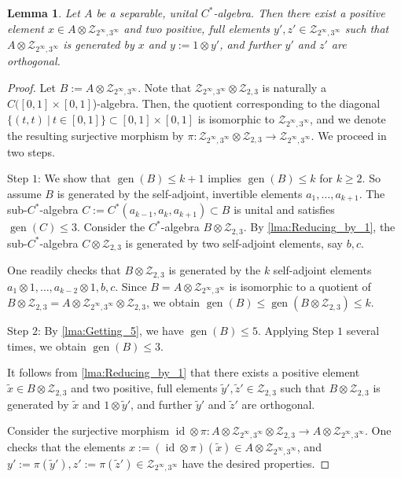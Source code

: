 \documentclass{amsart}
\newtheorem{lma}{Lemma}[section]
\theoremstyle{definition}
\begin{document}
\begin{lma}
\label{lma:Tensor_inf_dd_2}
    Let $A$ be a separable, unital {{$C^*$-al\-ge\-bra}}{}.
    Then there exist a positive element $x\in A\otimes \mathcal{Z}_{2^\infty,3^\infty}$ and two positive, full elements $y',z'\in \mathcal{Z}_{2^\infty,3^\infty}$ such that $A\otimes \mathcal{Z}_{2^\infty,3^\infty}$ is generated by $x$ and $y:=1\otimes y'$, and further $y'$ and $z'$ are orthogonal.
\end{lma}
\begin{proof}
    Let $B:=A\otimes\mathcal{Z}_{2^\infty,3^\infty}$.
    Note that $\mathcal{Z}_{2^\infty,3^\infty}\otimes\mathcal{Z}_{2,3}$ is naturally a $C([0,1]\times[0,1]$)-algebra.
    Then, the quotient corresponding to the diagonal $\{(t,t){\: |\:} t\in[0,1]\}\subset[0,1]\times[0,1]$ is isomorphic to $\mathcal{Z}_{2^\infty,3^\infty}$, and we denote the resulting surjective morphism by $\pi\colon\mathcal{Z}_{2^\infty,3^\infty}\otimes\mathcal{Z}_{2,3}\to\mathcal{Z}_{2^\infty,3^\infty}$.
    We proceed in two steps.

    Step $1$:
    We show that $\operatorname{gen}(B)\leq k+1$ implies $\operatorname{gen}(B)\leq k$ for $k\geq 2$.
    So assume $B$ is generated by the self-adjoint, invertible elements $a_1,\ldots,a_{k+1}$.
    The sub-{{$C^*$-al\-ge\-bra}}{} $C:=C^{*}(a_{k-1},a_k,a_{k+1})\subset B$ is unital and satisfies $\operatorname{gen}(C)\leq 3$.
    Consider the {{$C^*$-al\-ge\-bra}}{} $B\otimes\mathcal{Z}_{2,3}$.
    By \autoref{lma:Reducing_by_1}, the sub-{{$C^*$-al\-ge\-bra}}{} $C\otimes\mathcal{Z}_{2,3}$ is generated by two self-adjoint elements, say $b,c$.

    One readily checks that $B\otimes\mathcal{Z}_{2,3}$ is generated by the $k$ self-adjoint elements $a_1\otimes 1,\ldots,a_{k-2}\otimes 1,b,c$.
    Since $B=A\otimes\mathcal{Z}_{2^\infty,3^\infty}$ is isomorphic to a quotient of $B\otimes\mathcal{Z}_{2,3}=A\otimes\mathcal{Z}_{2^\infty,3^\infty}\otimes\mathcal{Z}_{2,3}$, we obtain $\operatorname{gen}(B)\leq\operatorname{gen}(B\otimes\mathcal{Z}_{2,3})\leq k$.

    Step $2$:
    By \autoref{lma:Getting_5}, we have $\operatorname{gen}(B)\leq 5$.
    Applying Step $1$ several times, we obtain $\operatorname{gen}(B)\leq 3$.

    It follows from \autoref{lma:Reducing_by_1} that there exists a positive element $\tilde{x}\in B\otimes\mathcal{Z}_{2,3}$ and two positive, full elements $\tilde{y}',\tilde{z}'\in \mathcal{Z}_{2,3}$ such that $B\otimes\mathcal{Z}_{2,3}$ is generated by $\tilde{x}$ and $1\otimes \tilde{y}'$, and further $\tilde{y}'$ and $\tilde{z}'$ are orthogonal.

    Consider the surjective morphism $\operatorname{id}\otimes\pi\colon A\otimes\mathcal{Z}_{2^\infty,3^\infty}\otimes\mathcal{Z}_{2,3} \to A\otimes\mathcal{Z}_{2^\infty,3^\infty}$.
    One checks that the elements $x:=(\operatorname{id}\otimes\pi)(\tilde{x})\in A\otimes\mathcal{Z}_{2^\infty,3^\infty}$, and $y':=\pi(\tilde{y}'), z':=\pi(\tilde{z}')\in\mathcal{Z}_{2^\infty,3^\infty}$ have the desired properties.
\end{proof}
\end{document}
